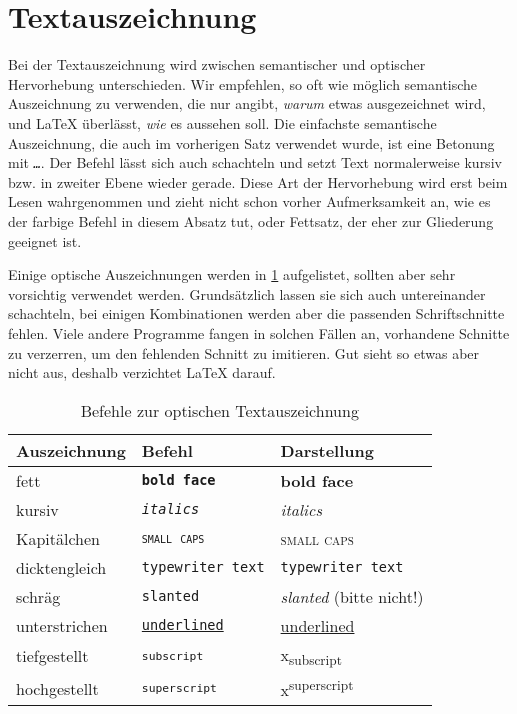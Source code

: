 \section{Textauszeichnung}

Bei der Textauszeichnung wird zwischen semantischer und optischer Hervorhebung unterschieden.
Wir empfehlen, so oft wie möglich semantische Auszeichnung zu verwenden, die nur angibt, \emph{warum} etwas ausgezeichnet wird, und \LaTeX{} überlässt, \emph{wie} es aussehen soll.
Die einfachste semantische Auszeichnung, die auch im vorherigen Satz verwendet wurde, ist eine Betonung mit \texttt{\emph{…}}.
Der Befehl lässt sich auch schachteln und setzt Text normalerweise kursiv bzw. in zweiter Ebene wieder gerade.
Diese Art der Hervorhebung wird erst beim Lesen wahrgenommen und zieht nicht schon vorher Aufmerksamkeit an, wie es der farbige Befehl in diesem Absatz tut, oder Fettsatz, der eher zur Gliederung geeignet ist.

Einige optische Auszeichnungen werden in \cref{tbl:optische-auszeichnung} aufgelistet, sollten aber sehr vorsichtig verwendet werden.
Grundsätzlich lassen sie sich auch untereinander schachteln, bei einigen Kombinationen werden aber die passenden Schriftschnitte fehlen.
Viele andere Programme fangen in solchen Fällen an, vorhandene Schnitte zu verzerren, um den fehlenden Schnitt zu imitieren.
Gut sieht so etwas aber nicht aus, deshalb verzichtet \LaTeX{} darauf.

\begin{table}[H]
	\center
	\begin{tabular}{lll}
		\toprule
		Auszeichnung & Befehl & Darstellung \\
		\midrule
		fett & \texttt{\textbf{bold face}} & \textbf{bold face} \\
		kursiv & \texttt{\textit{italics}} & \textit{italics} \\
		Kapitälchen & \texttt{\textsc{small caps}} & \textsc{small caps} \\
		dicktengleich & \texttt{\texttt{typewriter text}} & \texttt{typewriter text} \\
		schräg & \texttt{\texttt{slanted}} & \textsl{slanted} (bitte nicht!) \\
		unterstrichen & \texttt{\underline{underlined}} & \underline{underlined} \\
		tiefgestellt & \texttt{\textsubscript{subscript}} & x\textsubscript{subscript} \\
		hochgestellt & \texttt{\textsubscript{superscript}} & x\textsuperscript{superscript} \\
		\bottomrule
	\end{tabular}
	\caption{Befehle zur optischen Textauszeichnung}
	\label{tbl:optische-auszeichnung}
\end{table}

